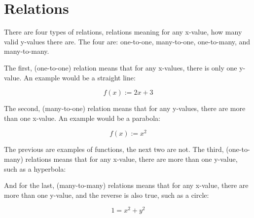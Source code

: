 \documentclass{book}
\begin{document}
\section{Relations}
There are four types of relations, relations meaning for any x-value, how many valid y-values there are.  The four are: one-to-one, many-to-one, one-to-many, and many-to-many.

The first, (one-to-one) relation means that for any x-values, there is only one y-value.  An example would be a straight line:
\begin{center}
	\[f(x) := 2x + 3\]
	\begin{center}
	\end{center}
\end{center}
The second, (many-to-one) relation means that for any y-values, there are more than one x-value.  An example would be a parabola:
\begin{center}
	\[f(x) := x^2\]
	\begin{center}
	\end{center}
\end{center}
The previous are examples of functions, the next two are not.  The third, (one-to-many) relations means that for any x-value, there are more than one y-value, such as a hyperbola:
\begin{center}
\end{center}
And for the last, (many-to-many) relations means that for any x-value, there are more than one y-value, and the reverse is also true, such as a circle:
\begin{center}
	\[1 = x^2 + y^2\]
	\begin{center}
	\end{center}
\end{center}
\end{document}
